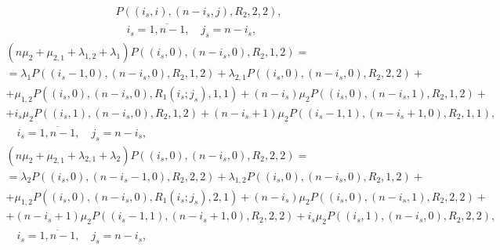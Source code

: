 {\begin{multline}
  P\left((i_s,i),(n-i_s,j),R_2,2,2\right), \\
  \quad i_s=\overline{1,n-1}, \quad j_s=n-i_s,
\label{eq:9.2}
\end{multline}
\begin{multline}
  \left(n\mu_2+\mu_{2,1}+\lambda_{1,2}+\lambda_1 \right)
  P\left((i_s,0),(n-i_s,0),R_2,1,2\right) = \\ =
  \lambda_1 P\left((i_s-1,0),(n-i_s,0),R_2,1,2\right)+ \lambda_{2,1}
  P\left((i_s,0),(n-i_s,0),R_2,2,2\right)+ \\ +
  \mu_{1,2} P\left((i_s,0),(n-i_s,0),R_1(i_s;j_s),1,1\right)+
  (n-i_s)\mu_2 P\left((i_s,0),(n-i_s,1),R_2,1,2\right) +\\ +
  i_s\mu_2 P\left((i_s,1),(n-i_s,0),R_2,1,2\right) + (n-i_s+1)\mu_2  P\left((i_s-1,1),(n-i_s+1,0),R_2,1,1\right), \\
  \quad i_s=\overline{1,n-1}, \quad j_s=n-i_s,
\label{eq:9.3}
\end{multline}
\begin{multline}
  \left(n\mu_2+\mu_{2,1}+\lambda_{2,1}+\lambda_2 \right)
  P\left((i_s,0),(n-i_s,0),R_2,2,2\right) = \\ = \lambda_2
  P\left((i_s,0),(n-i_s-1,0),R_2,2,2\right)+ \lambda_{1,2}
  P\left((i_s,0),(n-i_s,0),R_2,1,2\right)+ \\ + \mu_{1,2}
  P\left((i_s,0),(n-i_s,0),R_1(i_s;j_s),2,1\right)+ (n-i_s)\mu_2
  P\left((i_s,0),(n-i_s,1),R_2,2,2\right)+\\ +
  (n-i_s+1)\mu_2 P\left((i_s-1,1),(n-i_s+1,0),R_2,2,2\right)+  i_s\mu_2  P\left((i_s,1),(n-i_s,0),R_2,2,2\right), \\
  \quad i_s=\overline{1,n-1}, \quad j_s=n-i_s,
\label{eq:9.4}
\end{multline}

}
